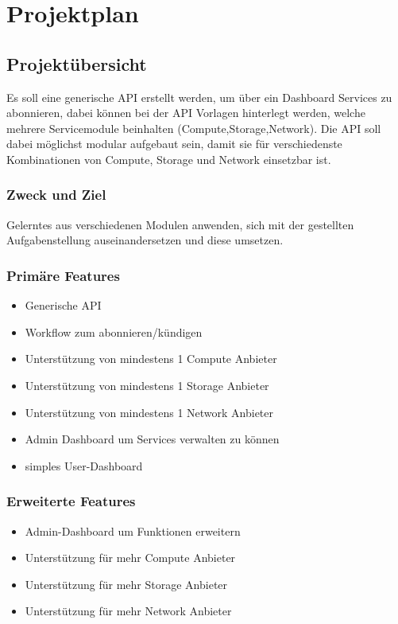 \chapter{Projektplan}
\section{Projektübersicht}
Es soll eine generische API erstellt werden, um über ein 
Dashboard Services zu abonnieren, dabei können bei der API Vorlagen 
hinterlegt werden, welche mehrere Servicemodule beinhalten 
(Compute,Storage,Network).
Die API soll dabei möglichst modular aufgebaut sein, damit sie für verschiedenste
Kombinationen von Compute, Storage und Network einsetzbar ist.
\subsection{Zweck und Ziel}
 Gelerntes aus verschiedenen Modulen anwenden, sich mit der gestellten 
 Aufgabenstellung auseinandersetzen 
 und diese umsetzen.

\subsection{Primäre Features}
\begin{itemize}
  \item Generische API
  \item Workflow zum abonnieren/kündigen
  \item Unterstützung von mindestens 1 Compute Anbieter
  \item Unterstützung von mindestens 1 Storage Anbieter
  \item Unterstützung von mindestens 1 Network Anbieter
  \item Admin Dashboard um Services verwalten zu können
  \item simples User-Dashboard
\end{itemize}
\subsection{Erweiterte Features}
\begin{itemize}
  \item Admin-Dashboard um Funktionen erweitern
  \item Unterstützung für mehr Compute Anbieter
  \item Unterstützung für mehr Storage Anbieter
  \item Unterstützung für mehr Network Anbieter
\end{itemize}
